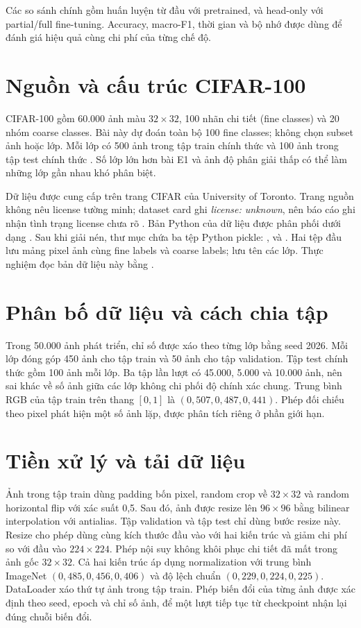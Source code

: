 \documentclass[12pt,a4paper]{report}
\begin{document}
Các so sánh chính gồm huấn luyện từ đầu với pretrained, và head-only với
partial/full fine-tuning. Accuracy, macro-F1, thời gian và bộ nhớ được dùng
để đánh giá hiệu quả cùng chi phí của từng chế độ.

\section{Nguồn và cấu trúc CIFAR-100}
CIFAR-100 gồm 60.000 ảnh màu $32\times32$, 100 nhãn chi tiết (fine classes)
và 20 nhóm coarse classes. Bài này dự đoán toàn bộ 100 fine classes; không
chọn subset ảnh hoặc lớp. Mỗi lớp có 500 ảnh trong tập train chính thức và 100 ảnh trong tập test chính thức \cite{cifar}. Số lớp lớn hơn bài E1 và ảnh độ phân giải thấp
có thể làm những lớp gần nhau khó phân biệt.

Dữ liệu được cung cấp trên trang CIFAR của University of Toronto. Trang nguồn không nêu license tường minh; dataset card  ghi \emph{license: unknown}, nên báo cáo ghi nhận tình trạng license chưa rõ \cite{cifar,hf}.
Bản Python của dữ liệu được phân phối dưới dạng . Sau khi giải nén, thư mục  chứa ba tệp Python pickle: ,  và . Hai tệp đầu lưu mảng pixel ảnh cùng fine labels và coarse labels;  lưu tên các lớp. Thực nghiệm đọc bản dữ liệu này bằng  \cite{cifar,torchvision}.

\section{Phân bố dữ liệu và cách chia tập}
Trong 50.000 ảnh phát triển, chỉ số được xáo theo từng lớp bằng seed
2026. Mỗi lớp đóng góp 450 ảnh cho tập train và 50 ảnh cho tập validation.
Tập test chính thức gồm 100 ảnh mỗi lớp. Ba tập lần lượt có 45.000,
5.000 và 10.000 ảnh, nên sai khác về số ảnh giữa các lớp không chi phối
độ chính xác chung. Trung bình RGB của tập train trên thang $[0,1]$
là $(0{,}507,0{,}487,0{,}441)$. Phép đối chiếu theo pixel phát hiện một số
ảnh lặp, được phân tích riêng ở phần giới hạn.

\section{Tiền xử lý và tải dữ liệu}
Ảnh trong tập train dùng padding bốn pixel, random crop về $32\times32$ và random horizontal flip với xác suất 0,5. Sau đó, ảnh được resize lên $96\times96$ bằng bilinear interpolation với antialias. Tập validation và tập test chỉ dùng bước resize này.
Resize cho phép dùng cùng kích thước đầu vào với hai kiến trúc và giảm chi phí so với đầu vào $224\times224$. Phép nội suy không khôi phục chi tiết đã mất trong ảnh gốc $32\times32$.
Cả hai kiến trúc áp dụng normalization với trung bình ImageNet
$(0{,}485,0{,}456,0{,}406)$ và độ lệch chuẩn $(0{,}229,0{,}224,0{,}225)$.
DataLoader xáo thứ tự ảnh trong tập train. Phép biến đổi của từng ảnh được
xác định theo seed, epoch và chỉ số ảnh, để một lượt tiếp tục từ
checkpoint nhận lại đúng chuỗi biến đổi.
\end{document}
